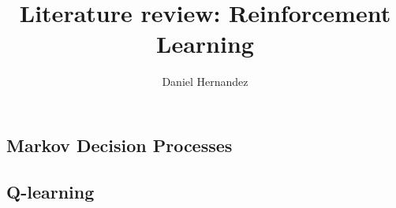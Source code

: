 \documentclass{article}
\title{\textbf{Literature review: Reinforcement Learning}}
\author{Daniel Hernandez}
\date{ }
\begin{document}
\maketitle


% 
% 
%
%
    \subsection{Markov Decision Processes}\label{section:markov-decision-processes}
    

    
    \subsection{Q-learning}
    
 
% 
%
% 
% 
% 

%





\end{document}
